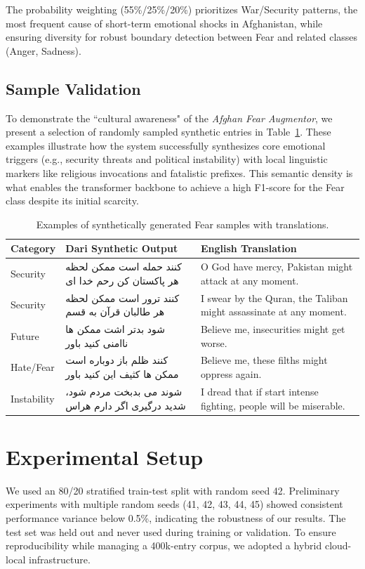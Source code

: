 \documentclass[runningheads]{llncs}
\newcommand{\textfarsi}[1]{{\foreignlanguage{arabic}{#1}}\xspace}
\begin{document}
The probability weighting (55\%/25\%/20\%) prioritizes War/Security patterns, the 
most frequent cause of short-term emotional shocks in Afghanistan, while 
ensuring diversity for robust boundary detection between Fear and related 
classes (Anger, Sadness).

\subsection{Sample Validation}
To demonstrate the ``cultural awareness" of the \textit{Afghan Fear Augmentor}, we present a selection of randomly sampled synthetic entries in Table~\ref{tab:aug_samples}. These examples illustrate how the system successfully synthesizes core emotional triggers (e.g., security threats and political instability) with local linguistic markers like religious invocations and fatalistic prefixes. This semantic density is what enables the transformer backbone to achieve a high F1-score for the Fear class despite its initial scarcity.

\begin{table}[H]
\centering
\caption{Examples of synthetically generated Fear samples with translations.}
\label{tab:aug_samples}
\begin{tabular}{@{}p{1.5cm} p{6.5cm} p{4.0cm}@{}}
\toprule
\textbf{Category} & \textbf{Dari Synthetic Output} & \textbf{English Translation} \\ \midrule
Security & \textfarsi{کنند حمله است ممکن لحظه هر پاکستان کن رحم خدا ای } &  O God have mercy, Pakistan might attack at any moment. \\
Security &\textfarsi{کنند ترور است ممکن لحظه هر طالبان قرآن به قسم} & I swear by the Quran, the Taliban might assassinate at any moment. \\
Future & \textfarsi{شود بدتر اشت ممکن  ها ناامنی   کنید باور} & Believe me, insecurities might get worse. \\
Hate/Fear & \textfarsi{کنند ظلم باز دوباره است ممکن  ها کثیف این کنید باور} & Believe me, these filths might oppress again. \\
Instability & \textfarsi{شوند می بدبخت مردم شود، شدید درگیری  اگر دارم هراس} & I dread that if  start intense fighting, people will be miserable. \\ \bottomrule
\end{tabular}
\end{table}
\section{Experimental Setup}
\label{sec:setup}
We used an 80/20 stratified train-test split with random seed 42. 
Preliminary experiments with multiple random seeds (41, 42, 43, 44, 45) 
showed consistent performance variance below 0.5\%, indicating the 
robustness of our results.  The test set was held out and never used during training or validation. To ensure reproducibility while managing a 400k-entry corpus, we adopted a hybrid cloud-local infrastructure.
\end{document}
